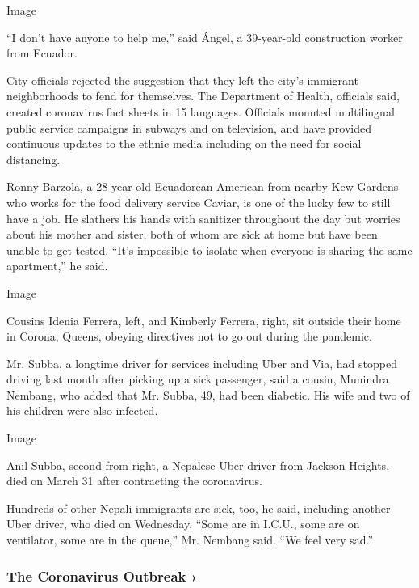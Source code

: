 Image

``I don't have anyone to help me,'' said Ángel, a 39-year-old
construction worker from Ecuador.

City officials rejected the suggestion that they left the city's
immigrant neighborhoods to fend for themselves. The Department of
Health, officials said, created coronavirus fact sheets in 15 languages.
Officials mounted multilingual public service campaigns in subways and
on television, and have provided continuous updates to the ethnic media
including on the need for social distancing.

Ronny Barzola, a 28-year-old Ecuadorean-American from nearby Kew Gardens
who works for the food delivery service Caviar, is one of the lucky few
to still have a job. He slathers his hands with sanitizer throughout the
day but worries about his mother and sister, both of whom are sick at
home but have been unable to get tested. ``It's impossible to isolate
when everyone is sharing the same apartment,'' he said.

Image

Cousins Idenia Ferrera, left, and Kimberly Ferrera, right, sit outside
their home in Corona, Queens, obeying directives not to go out during
the pandemic.~

Mr. Subba, a longtime driver for services including Uber and Via, had
stopped driving last month after picking up a sick passenger, said a
cousin, Munindra Nembang, who added that Mr. Subba, 49, had been
diabetic. His wife and two of his children were also infected.

Image

Anil Subba, second from right, a Nepalese Uber driver from Jackson
Heights, died on March 31 after contracting the coronavirus.

Hundreds of other Nepali immigrants are sick, too, he said, including
another Uber driver, who died on Wednesday. ``Some are in I.C.U., some
are on ventilator, some are in the queue,'' Mr. Nembang said. ``We feel
very sad.''

\href{https://www.nytimes3xbfgragh.onion/news-event/coronavirus?action=click\&pgtype=Article\&state=default\&region=MAIN_CONTENT_3\&context=storylines_faq}{}

\hypertarget{the-coronavirus-outbreak-}{%
\subsubsection{The Coronavirus Outbreak
›}\label{the-coronavirus-outbreak-}}

